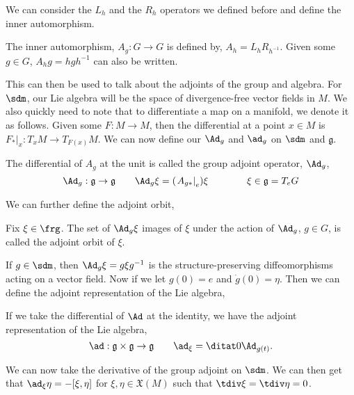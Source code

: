 \noindent
We can consider the $L_h$ and the $R_h$ operators we defined before and define the inner automorphism.
\begin{ndefi}
  The inner automorphism, $A_g : G \to G$ is defined by, $A_h = L_hR_{h^{-1}}$. Given some $g \in G$, $A_hg = hgh^{-1}$ can also be written.
\end{ndefi}
\noindent
This can then be used to talk about the adjoints of the group and algebra. For $\sdm$, our Lie algebra will be the space of divergence-free vector fields in $M$. We also quickly need to note that to differentiate a map on a manifold, we denote it as follows. Given some $F : M \to M$, then the differential at a point $x \in M$ is $\left.F_*\right|_x : T_xM \to T_{F(x)}M$. We can now define our $\Ad_g$ and $\ad_g$ on $\sdm$ and $\mathfrak{g}$.
\begin{ndefi}
  The differential of $A_g$ at the unit is called the group adjoint operator, $\Ad_g$,
  $$ \Ad_g : \mathfrak{g} \to \mathfrak{g} \qquad \Ad_g \xi = (\left. A_{g*} \right|_e)\xi \qquad \qquad \xi \in \mathfrak{g} = T_eG$$
\end{ndefi}
\noindent
We can further define the adjoint orbit,
\begin{ndefi}
  Fix $\xi \in \frg$. The set of $\Ad_g\xi$ images of $\xi$ under the action of $\Ad_g$, $g \in G$, is called the adjoint orbit of $\xi$.
\end{ndefi}
\noindent
If $g \in \sdm$, then $\Ad_g\xi = g\xi g^{-1}$ is the structure-preserving diffeomorphisms acting on a vector field. Now if we let $g(0) = e$ and $\dot g(0) = \eta$. Then we can define the adjoint representation of the Lie algebra,
\begin{ndefi}
  If we take the differential of $\Ad$ at the identity, we have the adjoint representation of the Lie algebra,
  $$ \ad : \mathfrak{g} \times \mathfrak{g} \to \mathfrak{g} \qquad \ad_\xi = \ditat 0 \Ad_{g(t)}. $$
\end{ndefi}
\noindent
We can now take the derivative of the group adjoint on $\sdm$. We can then get that $\ad_\xi\eta = -[\xi, \eta]$ for $\xi, \eta \in \mathfrak{X}(M)$ such that $\tdiv \xi = \tdiv \eta = 0$. \\

